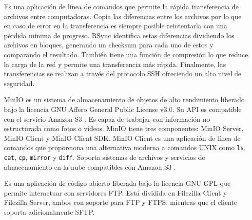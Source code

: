 \begin{description}
\sloppy
  \item[Rsync:] Es una aplicación de línea de comandos que permite la rápida transferencia de
  archivos entre computadoras. Copia las diferencias entre los archivos por lo que en caso de error
  en la transferencia es siempre posible reintentarla con una pérdida mínima de progreso. RSync
  identifica estas diferencias dividiendo los archivos en bloques, generando un checksum para cada
  uno de estos y comparando el resultado. También tiene una función de compresión lo que reduce la
  carga de la red y permite una transferencia más rápida. Finalmente, las transferencias se realizan
  a través del protocolo SSH ofreciendo un alto nivel de seguridad.

  \item[MinIO Client:] MinIO es un sistema de almacenamiento de objetos de alto rendimiento liberado
  bajo la licencia GNU Affero General Public License v3.0. Su API es compatible con el servicio
  Amazon S3 \citep{Gadban2021}. Es capaz de trabajar con información no estructurada como fotos o
  vídeos. MinIO tiene tres componentes: MinIO Server, MinIO Client y MinIO Client SDK. MinIO Client
  es una aplicación de línea de comandos que proporciona una alternativa moderna a comandos UNIX
  como \texttt{ls}, \texttt{cat}, \texttt{cp}, \texttt{mirror} y \texttt{diff}. Soporta sistemas de
  archivos y servicios de almacenamiento en la nube compatibles con Amazon S3
  \citep{Grandhe2026}.

  \item[Filezilla:] Es una aplicación de código abierto liberada bajo la licencia GNU GPL que permite
  interactuar con servidores FTP. Está dividida en Filezilla Client y Filezilla Server, ambos con
  soporte para FTP y FTPS, mientras que el cliente soporta adicionalmente SFTP.
\end{description}

